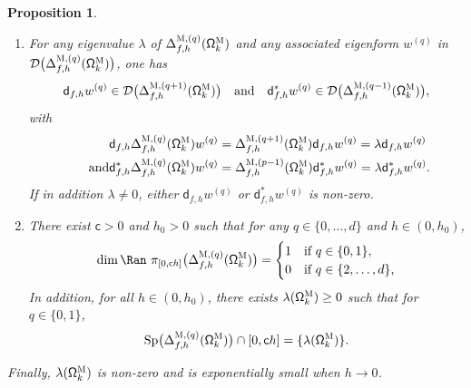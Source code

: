 \documentclass[JEP,XML,SOM,Unicode,NoEqCountersInSection,NoFloatCountersInSection,published]{cedram}
\newenvironment{enumeratei}
{\bgroup\def\theenumi{\roman{enumi}}\def\theenumii{\arabic{enumii}}\begin{enumerate}}
{\end{enumerate}\egroup}
\newcommand{\quand}{\quad\text{and}\quad}
\DeclareMathOperator\Sp{Sp}
\theoremstyle{plain}
\newtheorem{proposition}{Proposition}
\theoremstyle{definition}
\begin{document}
\begin{proposition}
\begin{enumeratei}
\item\label{pr.DeltaTNii}
For any eigenvalue $\lambda$ of $\Delta_{f,h}^{\textsc{M}, (q)} (\mathsf \Omega_k^{\textsc{M}})$
and any associated eigenform $w_{}^{(q)}$ in $\mathcal D\bigl(\Delta_{f,h}^{\textsc{M}, (q)} (\mathsf \Omega_k^{\textsc{M}})\bigr)$, one has\vspace*{-3pt}
\[
\mathsf d_{f,h}w_{}^{(q)}\in\mathcal D\bigl(\Delta_{f,h}^{\textsc{M},(q+1)}(\mathsf \Omega_k^{\textsc{M}}) \bigr)
\quand
\mathsf d^{*}_{f,h}w_{}^{(q)}\in \mathcal D\bigl(\Delta_{f,h}^{\textsc{M},(q-1)}(\mathsf \Omega_k^{\textsc{M}}) \bigr),
\]
with\vspace*{-7pt}
\begin{align*}
\mathsf d_{f,h}\Delta_{f,h}^{\textsc{M}, (q)}(\mathsf
\Omega_k^{\textsc{M}}) w_{}^{(q)}&=
\Delta_{f,h}^{\textsc{M}, (q+1)}(\mathsf \Omega_k^{\textsc{M}})\mathsf d_{f,h}w_{}^{(q)}
= \lambda \mathsf d_{f,h}w_{}^{(q)}
\\
\tag*{and}
\mathsf d^*_{f,h}\Delta_{f,h}^{\textsc{M},(q)} (\mathsf \Omega_k^{\textsc{M}})w_{}^{(q)}&=
\Delta_{f,h}^{\textsc{M},(p-1)} (\mathsf \Omega_k^{\textsc{M}})\mathsf d^*_{f,h}w_{}^{(q)}
= \lambda\mathsf d^*_{f,h}w_{}^{(q)}.
\end{align*}
If in addition $\lambda\neq 0$, either $\mathsf d_{f,h}w_{}^{(q)}$ or $\mathsf d^*_{f,h}w_{}^{(q)}$ is non-zero.
\item\label{pr.DeltaTNiii}
There exist $\mathsf c>0$ and $h_0>0$ such that for any $q\in\{0,\dots,d\}$ and $h\in (0,h_0)$,\vspace*{-3pt}
\[
\dim\Ran \ \pi_{[0,\mathsf ch ]}\bigl(\Delta_{f,h}^{\textsc{M},(q)} (\mathsf \Omega_k^{\textsc{M}})\bigr)
=\begin{cases}
1 &\text{if}\ q\in\{0,1\},\\
0 &\text{if} \ q\in\{2,\ldots,d\},
\end{cases}
\]
In addition, for all $h\in (0,h_0)$, there exists $\lambda(\mathsf \Omega_k^{\textsc{M}})\ge 0$ such that for $q\in \{0,1\}$,\vspace*{-3pt}
\[
\Sp \bigl(\Delta_{f,h}^{\textsc{M},(q)} (\mathsf \Omega_k^{\textsc{M}})\bigr)\cap [0,\mathsf ch ]
=
\{ \lambda(\mathsf \Omega_k^{\textsc{M}})\}.
\]
\end{enumeratei}
Finally, $\lambda(\mathsf \Omega_k^{\textsc{M}})$ is non-zero and is exponentially small when $h\to 0$.
\end{proposition}
\end{document}
